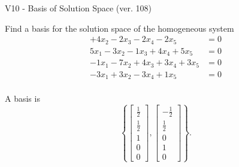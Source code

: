 \begin{exercise}
  \begin{exerciseTitle}V10 - Basis of Solution Space (ver. 108)\end{exerciseTitle}
  \begin{exerciseStatement}
    Find a basis for the solution space of the homogeneous system 
\begin{align*}
 + 4 x_ 2 -2 x_ 3 -2 x_ 4 -2 x_ 5 &= 0  \\ 
  5 x_ 1 -3 x_ 2 -1 x_ 3 + 4 x_ 4 + 5 x_ 5 &= 0  \\ 
  -1 x_ 1 -7 x_ 2 + 4 x_ 3 + 3 x_ 4 + 3 x_ 5 &= 0  \\ 
  -3 x_ 1 + 3 x_ 2 -3 x_ 4 + 1 x_ 5 &= 0  \\ 
 \end{align*}


 
  \end{exerciseStatement}

  \begin{exerciseAnswer}
   A basis is   
\[\left\{\left[\begin{array}{c}
\frac{1}{2} \\
\frac{1}{2} \\
1 \\
0 \\
0
\end{array}\right] , \left[\begin{array}{c}
-\frac{1}{2} \\
\frac{1}{2} \\
0 \\
1 \\
0
\end{array}\right]\right\}.\]

  


  \end{exerciseAnswer}
\end{exercise}